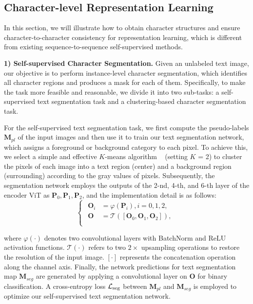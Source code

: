 \documentclass[10pt,twocolumn,letterpaper]{article}
\begin{document}
\subsection{Character-level Representation Learning}
In this section, we will illustrate how to obtain character structures and ensure character-to-character consistency for representation learning, which is different from existing sequence-to-sequence self-supervised methods.

\noindent \textbf{1) Self-supervised Character Segmentation.}\label{section:sec3.2.1}
Given an unlabeled text image, our objective is to perform instance-level character segmentation, which identifies all character regions and produces a mask for each of them.
Specifically, to make the task more feasible and reasonable, we divide it into two sub-tasks: a self-supervised text segmentation task and a clustering-based character segmentation task.

For the self-supervised text segmentation task, we first compute the pseudo-labels $\mathbf{M}_{pl}$ of the input images and then use it to train our text segmentation network, which assigns a foreground or background category to each pixel.
To achieve this, we select a simple and effective $K$-means algorithm ~\cite{hartigan1979algorithm} (setting $K$ = 2) to cluster the pixels of each image into a text region (center) and a background
region (surrounding) according to the gray values of pixels. Subsequently, the segmentation network employs the outputs of the 2-nd, 4-th, and 6-th layer of the encoder ViT as $\mathbf{P}_{0}, \mathbf{P}_{1}, \mathbf{P}_{2}$, and the implementation detail is as follows:
{\setlength\abovedisplayskip{1pt}
\setlength\belowdisplayskip{1pt}
\begin{equation}
  \begin{cases}
    \begin{aligned}
      \mathbf{O}_{i} &= \varphi(\mathbf{P}_{i}), i=0,1,2, \\
      \mathbf{O} &= \mathcal{T}([\mathbf{O}_{0}, \mathbf{O}_{1}, \mathbf{O}_{2}]),\\
    \end{aligned}
  \end{cases}
\end{equation}}

\noindent where $\varphi(\cdot)$ denotes two convolutional layers with BatchNorm and ReLU activation functions.
$\mathcal{T}(\cdot)$ refers to two $2 \times$ upsampling operations to restore the resolution of the input image. $[\cdot]$ represents the concatenation operation along the channel axis. 
Finally, the network predictions for text segmentation map $\mathbf{M}_{seg}$ are generated by applying a convolutional layer on $\mathbf{O}$ for binary classification.
A cross-entropy loss $\mathcal{L}_{\rm seg}$ between $\mathbf{M}_{pl}$ and $\mathbf{M}_{seg}$ is employed to optimize our self-supervised text segmentation network. 
\end{document}
